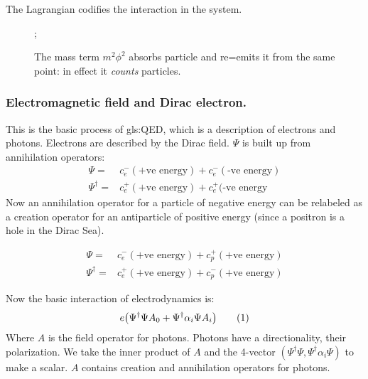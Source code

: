 \documentclass[]{article}
\newcommand\numberthis{\addtocounter{equation}{1}\tag{\theequation}}
\begin{document}
The Lagrangian codifies the interaction in the system.

\begin{figure}[H]
	\begin{center}
		\caption[The mass term $m^2\phi^2$]{The mass term $m^2\phi^2$ absorbs particle and re=emits it from the same point: in effect it \emph{counts} particles.}
		;
	\end{center}
\end{figure}

\subsubsection{Electromagnetic field and Dirac electron.}

This is the basic process of \glsdesc{gls:QED}, which is a description of electrons and photons. Electrons are described by the Dirac field. $\Psi$ is built up from annihilation operators:
\begin{align*}
	\Psi =& c_e^-(\text{+ve energy}) + c_e^-(\text{-ve energy})\\
	\Psi^\dagger =& c_e^+(\text{+ve energy}) + c_e^+(\text{-ve energy}
\end{align*}
Now an annihilation operator for a particle of negative energy can be relabeled as a creation operator for an antiparticle of positive energy (since a positron is a hole in the Dirac Sea).

\begin{align*}
	\Psi =& c_e^-(\text{+ve energy}) + c_p^+(\text{+ve energy}) \\
	\Psi^\dagger =&  c_e^+(\text{+ve energy}) + c_p^-(\text{+ve energy})
\end{align*}

Now the basic interaction of electrodynamics is:
\begin{align*}
	e \big( \Psi^\dagger \Psi A_0 + 	\Psi^\dagger \alpha_i  \Psi A_i \big)  \numberthis \label{eq:basic:interaction}
\end{align*}
Where $A$ is the field operator for photons. Photons have a directionality, their polarization. We take the inner product of $A$ and the 4-vector $(\Psi^\dagger \Psi, \Psi^\dagger \alpha_i  \Psi) $ to make a scalar. $A$ contains creation and annihilation operators for photons.
\end{document}
